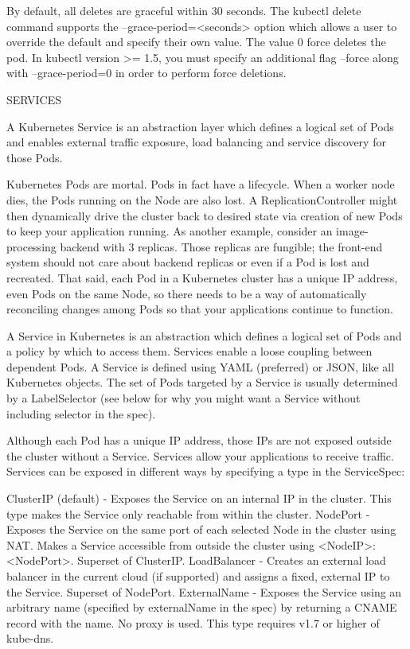 By default, all deletes are graceful within 30 seconds. The kubectl delete command supports the --grace-period=<seconds> option which allows a user to override the default and specify their own value. The value 0 force deletes the pod. In kubectl version >= 1.5, you must specify an additional flag --force along with --grace-period=0 in order to perform force deletions.

SERVICES

A Kubernetes Service is an abstraction layer which defines a logical set of Pods and enables external traffic exposure, load balancing and service discovery for those Pods.

Kubernetes Pods are mortal. Pods in fact have a lifecycle. When a worker node dies, the Pods running on the Node are also lost. A ReplicationController might then dynamically drive the cluster back to desired state via creation of new Pods to keep your application running. As another example, consider an image-processing backend with 3 replicas. Those replicas are fungible; the front-end system should not care about backend replicas or even if a Pod is lost and recreated. That said, each Pod in a Kubernetes cluster has a unique IP address, even Pods on the same Node, so there needs to be a way of automatically reconciling changes among Pods so that your applications continue to function.

A Service in Kubernetes is an abstraction which defines a logical set of Pods and a policy by which to access them. Services enable a loose coupling between dependent Pods. A Service is defined using YAML (preferred) or JSON, like all Kubernetes objects. The set of Pods targeted by a Service is usually determined by a LabelSelector (see below for why you might want a Service without including selector in the spec).

Although each Pod has a unique IP address, those IPs are not exposed outside the cluster without a Service. Services allow your applications to receive traffic. Services can be exposed in different ways by specifying a type in the ServiceSpec:

ClusterIP (default) - Exposes the Service on an internal IP in the cluster. This type makes the Service only reachable from within the cluster.
NodePort - Exposes the Service on the same port of each selected Node in the cluster using NAT. Makes a Service accessible from outside the cluster using <NodeIP>:<NodePort>. Superset of ClusterIP.
LoadBalancer - Creates an external load balancer in the current cloud (if supported) and assigns a fixed, external IP to the Service. Superset of NodePort.
ExternalName - Exposes the Service using an arbitrary name (specified by externalName in the spec) by returning a CNAME record with the name. No proxy is used. This type requires v1.7 or higher of kube-dns.

